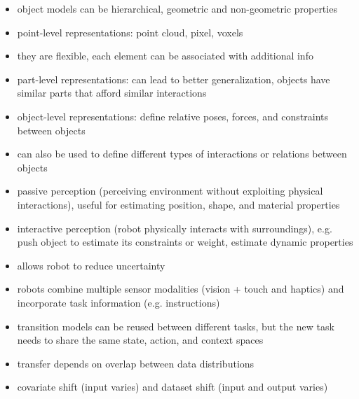 \begin{itemize}
  \item object models can be hierarchical, geometric and non-geometric properties
  \item point-level representations: point cloud, pixel, voxels
  \item they are flexible, each element can be associated with additional info
  \item part-level representations: can lead to better generalization, objects have similar parts that afford similar interactions
  \item object-level representations: define relative poses, forces, and constraints between objects
  \item can also be used to define different types of interactions or relations between objects
  \item passive perception (perceiving environment without exploiting physical interactions), useful for estimating position, shape, and material properties
  \item interactive perception (robot physically interacts with surroundings), e.g. push object to estimate its constraints or weight, estimate dynamic properties
  \item allows robot to reduce uncertainty
  \item robots combine multiple sensor modalities (vision + touch and haptics) and incorporate task information (e.g. instructions)
  \item transition models can be reused between different tasks, but the new task needs to share the same state, action, and context spaces
  \item transfer depends on overlap between data distributions
  \item covariate shift (input varies) and dataset shift (input and output varies)
\end{itemize}
